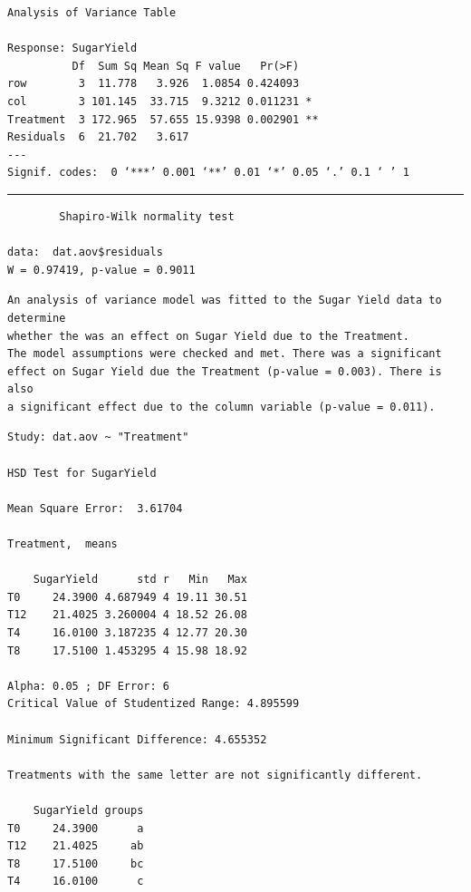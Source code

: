 \documentclass[a4paper, 10pt, fleqn, twosided]{memoir}
\begin{document}
\begin{tcolorbox}[title = Exercise 6 output continued]
\begin{verbatim}
Analysis of Variance Table

Response: SugarYield
          Df  Sum Sq Mean Sq F value   Pr(>F)
row        3  11.778   3.926  1.0854 0.424093
col        3 101.145  33.715  9.3212 0.011231 *
Treatment  3 172.965  57.655 15.9398 0.002901 **
Residuals  6  21.702   3.617
---
Signif. codes:  0 ‘***’ 0.001 ‘**’ 0.01 ‘*’ 0.05 ‘.’ 0.1 ‘ ’ 1

\end{verbatim}
{\color{outpt} {\hrule height 1pt}}
\begin{verbatim}
        Shapiro-Wilk normality test

data:  dat.aov$residuals
W = 0.97419, p-value = 0.9011
\end{verbatim}

\end{tcolorbox}


\begin{tcolorbox}[title = Exercise 6 interpretation]
\begin{verbatim}
An analysis of variance model was fitted to the Sugar Yield data to determine
whether the was an effect on Sugar Yield due to the Treatment.
The model assumptions were checked and met. There was a significant
effect on Sugar Yield due the Treatment (p-value = 0.003). There is also
a significant effect due to the column variable (p-value = 0.011).
\end{verbatim}
\end{tcolorbox}

\begin{tcolorbox}[title = Exercise 6 output continued]
\begin{verbatim}
Study: dat.aov ~ "Treatment"

HSD Test for SugarYield

Mean Square Error:  3.61704

Treatment,  means

    SugarYield      std r   Min   Max
T0     24.3900 4.687949 4 19.11 30.51
T12    21.4025 3.260004 4 18.52 26.08
T4     16.0100 3.187235 4 12.77 20.30
T8     17.5100 1.453295 4 15.98 18.92

Alpha: 0.05 ; DF Error: 6
Critical Value of Studentized Range: 4.895599

Minimum Significant Difference: 4.655352

Treatments with the same letter are not significantly different.

    SugarYield groups
T0     24.3900      a
T12    21.4025     ab
T8     17.5100     bc
T4     16.0100      c
\end{verbatim}
\end{tcolorbox}
\end{document}
